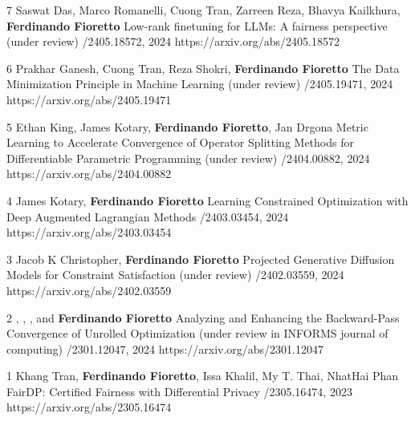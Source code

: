 \begin{pubs}

\wsentry
	{7}
	{\student{} Saswat Das,  Marco Romanelli, \student{} Cuong Tran, \student{} Zarreen Reza, 
	Bhavya Kailkhura, {\bf Ferdinando Fioretto}}
	{Low-rank finetuning for LLMs: A fairness perspective}
	{(under review) /2405.18572, 2024}
	{https://arxiv.org/abs/2405.18572}

\wsentry
	{6}
	{Prakhar Ganesh, \student{} Cuong Tran, Reza Shokri, {\bf Ferdinando Fioretto}}
	{The Data Minimization Principle in Machine Learning}
	{(under review) /2405.19471, 2024}
	{https://arxiv.org/abs/2405.19471}

\wsentry
	{5}
	{Ethan King, \student{} James Kotary, {\bf Ferdinando Fioretto}, Jan Drgona}
	{Metric Learning to Accelerate Convergence of Operator Splitting Methods for Differentiable Parametric Programming}
	{(under review) /2404.00882, 2024}
	{https://arxiv.org/abs/2404.00882}

\wsentry
	{4}
	{\student{} James Kotary, {\bf Ferdinando Fioretto}}
	{Learning Constrained Optimization with Deep Augmented Lagrangian Methods}
	{/2403.03454, 2024}
	{https://arxiv.org/abs/2403.03454}

\wsentry
	{3}
	{\student{} Jacob K Christopher, {\bf Ferdinando Fioretto}}
  	{Projected Generative Diffusion Models for Constraint Satisfaction}
	{(under review) /2402.03559, 2024}
	{https://arxiv.org/abs/2402.03559}

\wsentry
	{2}
	{, , ,
	and {\bf Ferdinando Fioretto}}
	{Analyzing and Enhancing the Backward-Pass Convergence of Unrolled Optimization}	
	{(under review in INFORMS journal of computing) /2301.12047, 2024}
	{https://arxiv.org/abs/2301.12047}

\wsentry
	{1}
	{Khang Tran, {\bf Ferdinando Fioretto}, Issa Khalil, My T. Thai, NhatHai Phan} 
	{FairDP: Certified Fairness with Differential Privacy}
	{/2305.16474, 2023}
	{https://arxiv.org/abs/2305.16474}
\end{pubs}

